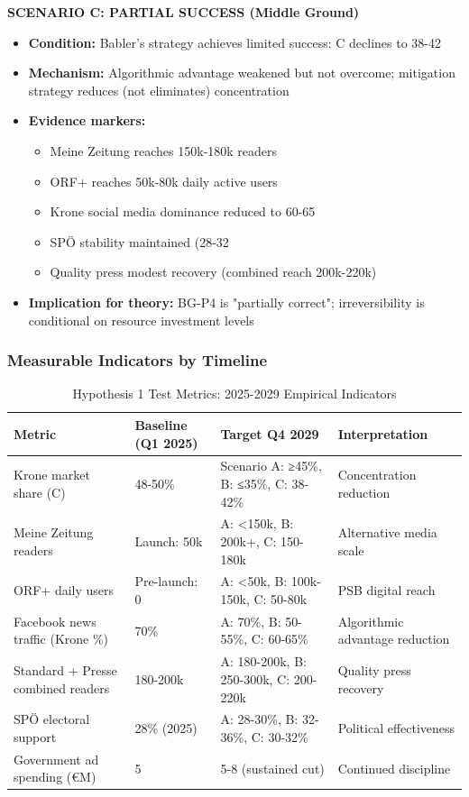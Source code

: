 \textbf{SCENARIO C: PARTIAL SUCCESS (Middle Ground)}
\begin{itemize}
\item \textbf{Condition:} Babler's strategy achieves limited success: C declines to 38-42%
\item \textbf{Mechanism:} Algorithmic advantage weakened but not overcome; mitigation strategy reduces (not eliminates) concentration
\item \textbf{Evidence markers:}
  \begin{itemize}
  \item Meine Zeitung reaches 150k-180k readers
  \item ORF+ reaches 50k-80k daily active users
  \item Krone social media dominance reduced to 60-65%
  \item SPÖ stability maintained (28-32%
  \item Quality press modest recovery (combined reach 200k-220k)
  \end{itemize}
\item \textbf{Implication for theory:} BG-P4 is "partially correct"; irreversibility is conditional on resource investment levels
\end{itemize}

\subsubsection*{Measurable Indicators by Timeline}

\begin{table}[h]
\centering
\small
\caption{Hypothesis 1 Test Metrics: 2025-2029 Empirical Indicators}
\label{tab:h1-test-metrics}
\begin{tabular}{|p{2cm}|p{2.5cm}|p{2cm}|p{3.5cm}|}
\hline
\textbf{Metric} & \textbf{Baseline (Q1 2025)} & \textbf{Target Q4 2029} & \textbf{Interpretation} \\
\hline
Krone market share (C) & 48-50\% & Scenario A: ≥45\%, B: ≤35\%, C: 38-42\% & Concentration reduction \\
\hline
Meine Zeitung readers & Launch: 50k & A: <150k, B: 200k+, C: 150-180k & Alternative media scale \\
\hline
ORF+ daily users & Pre-launch: 0 & A: <50k, B: 100k-150k, C: 50-80k & PSB digital reach \\
\hline
Facebook news traffic (Krone \%) & 70\% & A: 70\%, B: 50-55\%, C: 60-65\% & Algorithmic advantage reduction \\
\hline
Standard + Presse combined readers & 180-200k & A: 180-200k, B: 250-300k, C: 200-220k & Quality press recovery \\
\hline
SPÖ electoral support & 28\% (2025) & A: 28-30\%, B: 32-36\%, C: 30-32\% & Political effectiveness \\
\hline
Government ad spending (€M) & 5 & 5-8 (sustained cut) & Continued discipline \\
\hline
\end{tabular}
\end{table}

